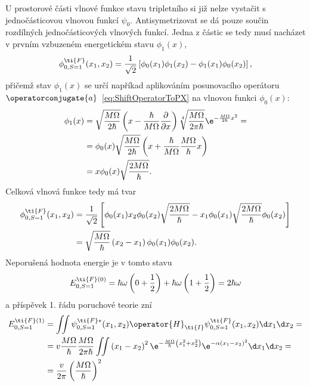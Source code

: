 \begin{solution}
	U prostorové části vlnové funkce stavu tripletního si již nelze vystačit s jednočásticovou vlnovou funkcí $\psi_{0}$.
	Antisymetrizovat se dá pouze součin rozdílných jednočásticových vlnových funkcí.
    Jedna z částic se tedy musí nacházet v prvním vzbuzeném energetickém stavu $\phi_{1}(x)$,
	\begin{equation}
		\phi^{\ti{F}}_{0,S=1}(x_{1},x_{2})
			=\frac{1}{\sqrt{2}}\left[\phi_{0}(x_{1})\phi_{1}(x_{2})-\phi_{1}(x_{1})\phi_{0}(x_{2})\right],
	\end{equation}
	přičemž stav $\phi_{1}(x)$ se určí napříkad aplikováním posunovacího operátoru $\operatorconjugate{a}$~\eqref{eq:ShiftOperatorToPX} na vlnovou funkci $\phi_{0}(x)$:
	\begin{align}
		\phi_{1}(x)
			&=\sqrt{\frac{M\Omega}{2\hbar}}\left(x-\frac{\hbar}{M\Omega}\frac{\partial}{\partial x}\right)
				\sqrt[4]{\frac{M\Omega}{2\pi\hbar}}\e^{-\frac{M\Omega}{2\hbar}x^{2}}=\nonumber\\
			&=\phi_{0}(x)\sqrt{\frac{M\Omega}{2\hbar}}\left(x+\frac{\hbar}{M\Omega}\frac{M\Omega}{\hbar}x\right)\nonumber\\
			&=x\phi_{0}(x)\sqrt{\frac{2M\Omega}{\hbar}}.
	\end{align}
	Celková vlnová funkce tedy má tvar
	\begin{align}
		\phi^{\ti{F}}_{0,S=1}(x_{1},x_{2})
			&=\frac{1}{\sqrt{2}}\left[\phi_{0}(x_{1})x_{2}\phi_{0}(x_{2})\sqrt{\frac{2M\Omega}{\hbar}}-x_{1}\phi_{0}(x_{1})\sqrt{\frac{2M\Omega}{\hbar}}\phi_{0}(x_{2})\right]\nonumber\\
			&=\sqrt{\frac{M\Omega}{\hbar}}\left(x_{2}-x_{1}\right)\phi_{0}(x_{1})\phi_{0}(x_{2}).
	\end{align}
	Neporušená hodnota energie je v tomto stavu
	\begin{equation}
		E_{0,S=1}^{\ti{F}(0)}
			=\hbar\omega\left(0+\frac{1}{2}\right)+\hbar\omega\left(1+\frac{1}{2}\right)
			=2\hbar\omega
	\end{equation}
	a příspěvek 1. řádu poruchové teorie zní
	\begin{align}
		E_{0,S=1}^{\ti{F}(1)}
			&=\iint\psi^{\ti{F}*}_{0,S=1}(x_{1},x_{2})\operator{H}_{\ti{I}}\psi_{0,S=1}^{\ti{F}}(x_{1},x_{2})\d x_{1}\d x_{2}=\nonumber\\
			&=v\frac{M\Omega}{\hbar}\frac{M\Omega}{2\pi\hbar}
				\iint\left(x_{1}-x_{2}\right)^{2}\e^{-\frac{M\Omega}{\hbar}\left(x_{1}^{2}+x_{2}^{2}\right)}
				\e^{-\alpha\left(x_{1}-x_{2}\right)^{2}}\d x_{1}\d x_{2}=\nonumber\\
			&=\frac{v}{2\pi}\left(\frac{M\Omega}{\hbar}\right)^{2}

\end{align}
\end{solution}
